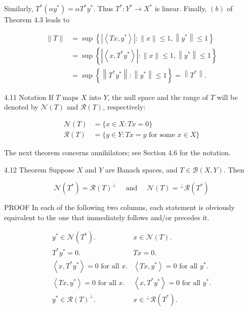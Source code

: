 \documentclass[10pt]{article}
\begin{document}
Similarly, $T^{*}\left(\alpha y^{*}\right)=\alpha T^{*} y^{*}$. Thus $T^{*}: Y^{*} \rightarrow X^{*}$ is linear. Finally, $(b)$ of Theorem 4.3 leads to

$$
\begin{aligned}
\|T\| & =\sup \left\{\left|\left\langle T x, y^{*}\right\rangle\right|:\|x\| \leq 1,\left\|y^{*}\right\| \leq 1\right\} \\
& =\sup \left\{\left|\left\langle x, T^{*} y^{*}\right\rangle\right|:\|x\| \leq 1,\left\|y^{*}\right\| \leq 1\right\} \\
& =\sup \left\{\left\|T^{*} y^{*}\right\|:\left\|y^{*}\right\| \leq 1\right\}=\left\|T^{*}\right\| .
\end{aligned}
$$

4.11 Notation If $T$ maps $X$ into $Y$, the null space and the range of $T$ will be denoted by $\mathcal{N}(T)$ and $\mathscr{R}(T)$, respectively:

$$
\begin{aligned}
\mathscr{N}(T) & =\{x \in X: T x=0\} \\
\mathscr{R}(T) & =\{y \in Y: T x=y \text { for some } x \in X\}
\end{aligned}
$$

The next theorem concerns annihilators; see Section 4.6 for the notation.

4.12 Theorem Suppose $X$ and $Y$ are Banach spaces, and $T \in \mathscr{B}(X, Y)$. Then

$$
\mathscr{N}\left(T^{*}\right)=\mathscr{R}(T)^{\perp} \quad \text { and } \quad \mathscr{N}(T)={ }^{\perp} \mathscr{R}\left(T^{*}\right)
$$

PROOF In each of the following two columns, each statement is obviously equivalent to the one that immediately follows and/or precedes it.

$$
\begin{array}{ll}
y^{*} \in \mathscr{N}\left(T^{*}\right) . & x \in \mathscr{N}(T) . \\
T^{*} y^{*}=0 . & T x=0 . \\
\left\langle x, T^{*} y^{*}\right\rangle=0 \text { for all } x . & \left\langle T x, y^{*}\right\rangle=0 \text { for all } y^{*} . \\
\left\langle T x, y^{*}\right\rangle=0 \text { for all } x . & \left\langle x, T^{*} y^{*}\right\rangle=0 \text { for all } y^{*} . \\
y^{*} \in \mathscr{R}(T)^{\perp} . & x \in{ }^{\perp} \mathscr{R}\left(T^{*}\right) .
\end{array}
$$
\end{document}
